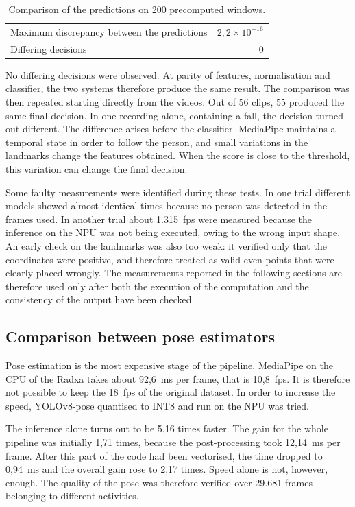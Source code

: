 \begin{table}[htbp]
\centering
\caption{Comparison of the predictions on 200 precomputed windows.}
\label{tab:parita}
\begin{tabular}{lr}
\toprule
Maximum discrepancy between the predictions & $2{,}2\times10^{-16}$ \\
Differing decisions & 0 \\
\bottomrule
\end{tabular}
\end{table}

No differing decisions were observed. At parity of features, normalisation and classifier, the two systems therefore produce the same result. The comparison was then repeated starting directly from the videos. Out of 56 clips, 55 produced the same final decision. In one recording alone, containing a fall, the decision turned out different.
The difference arises before the classifier. MediaPipe maintains a temporal state in order to follow the person, and small variations in the landmarks change the features obtained. When the score is close to the threshold, this variation can change the final decision.

Some faulty measurements were identified during these tests. In one trial different models showed almost identical times because no person was detected in the frames used. In another trial about 1.315~fps were measured because the inference on the NPU was not being executed, owing to the wrong input shape.
An early check on the landmarks was also too weak: it verified only that the coordinates were positive, and therefore treated as valid even points that were clearly placed wrongly. The measurements reported in the following sections are therefore used only after both the execution of the computation and the consistency of the output have been checked.

\subsection{Comparison between pose estimators}
\label{sec:stimatore}

Pose estimation is the most expensive stage of the pipeline. MediaPipe on the CPU of the Radxa takes about 92,6~ms per frame, that is 10,8~fps. It is therefore not possible to keep the 18~fps of the original dataset. In order to increase the speed, YOLOv8-pose quantised to INT8 and run on the NPU was tried.

The inference alone turns out to be 5,16 times faster. The gain for the whole pipeline was initially 1,71 times, because the post-processing took 12,14~ms per frame. After this part of the code had been vectorised, the time dropped to 0,94~ms and the overall gain rose to 2,17 times.
Speed alone is not, however, enough. The quality of the pose was therefore verified over 29.681 frames belonging to different activities.

